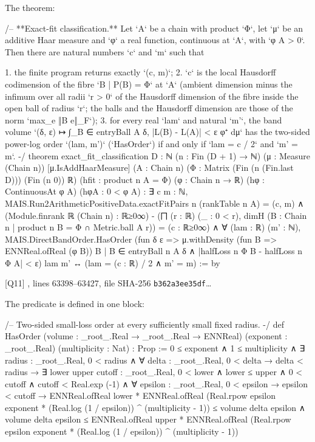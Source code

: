 \documentclass[11pt,a4paper]{article}
\newcommand{\leansource}[5]{{\footnotesize\raggedright\color{black!60}%
  [Q#1] \lean{#2}, lines #3--#4, file SHA-256 \texttt{#5}\ldots\par}\smallskip}
\theoremstyle{definition}
\theoremstyle{remark}
\numberwithin{equation}{section}
\begin{document}
The theorem:
\begin{LeanCode}
/-- **Exact-fit classification.**  Let `A` be a chain with product `Φ`, let `μ` be an
additive Haar measure and `φ` a real function, continuous at `A`, with `φ A > 0`.
Then there are natural numbers `c` and `m` such that

1. the finite program returns exactly `{(c, m)}`;
2. `c` is the local Hausdorff codimension of the fibre `{B | P(B) = Φ}` at `A`
   (ambient dimension minus the infimum over all radii `r > 0` of the Hausdorff
   dimension of the fibre inside the open ball of radius `r`; the balls and the
   Hausdorff dimension are those of the norm `max_e ‖B e‖_F`);
3. for every real `lam` and natural `m'`, the band volume
   `(δ, ε) ↦ ∫_{B ∈ entryBall A δ, |L(B) - L(A)| < ε} φ⁺ dμ` has the two-sided
   power-log order `(lam, m')` (`HasOrder`) if and only if `lam = c / 2` and `m' = m`. -/
theorem exact_fit_classification
    {D : ℕ} (n : Fin (D + 1) → ℕ)
    (μ : Measure (Chain n)) [μ.IsAddHaarMeasure]
    (A : Chain n) (Φ : Matrix (Fin (n (Fin.last D))) (Fin (n 0)) ℝ)
    (hfit : product n A = Φ)
    (φ : Chain n → ℝ) (hφ : ContinuousAt φ A) (hφA : 0 < φ A) :
    ∃ c m : ℕ,
      MAIS.Run2ArithmeticPositiveData.exactFitPairs n (rankTable n A) = {(c, m)} ∧
      (Module.finrank ℝ (Chain n) : ℝ≥0∞) -
          (⨅ (r : ℝ) (_ : 0 < r),
            dimH ({B : Chain n | product n B = Φ} ∩ Metric.ball A r)) =
        (c : ℝ≥0∞) ∧
      ∀ (lam : ℝ) (m' : ℕ),
        MAIS.DirectBandOrder.HasOrder
            (fun δ ε => μ.withDensity (fun B => ENNReal.ofReal (φ B))
              {B | B ∈ entryBall n A δ ∧ |halfLoss n Φ B - halfLoss n Φ A| < ε})
            lam m' ↔
          (lam = (c : ℝ) / 2 ∧ m' = m) := by
\end{LeanCode}
\leansource{11}{ExactFitFull_2026_10_28_UTC.lean}{63398}{63427}{b362a3ee35df}
The predicate  is defined in one block:
\begin{LeanCode}
/-- Two-sided small-loss order at every sufficiently small fixed radius. -/
def HasOrder (volume : _root_.Real → _root_.Real → ENNReal)
    (exponent : _root_.Real) (multiplicity : Nat) : Prop :=
  0 ≤ exponent ∧ 1 ≤ multiplicity ∧
  ∃ radius : _root_.Real, 0 < radius ∧
    ∀ delta : _root_.Real, 0 < delta → delta < radius →
      ∃ lower upper cutoff : _root_.Real,
        0 < lower ∧ lower ≤ upper ∧ 0 < cutoff ∧ cutoff < Real.exp (-1) ∧
        ∀ epsilon : _root_.Real, 0 < epsilon → epsilon < cutoff →
          ENNReal.ofReal lower *
            ENNReal.ofReal (Real.rpow epsilon exponent *
              (Real.log (1 / epsilon)) ^ (multiplicity - 1)) ≤ volume delta epsilon ∧
          volume delta epsilon ≤ ENNReal.ofReal upper *
            ENNReal.ofReal (Real.rpow epsilon exponent *
              (Real.log (1 / epsilon)) ^ (multiplicity - 1))
\end{LeanCode}
\end{document}
